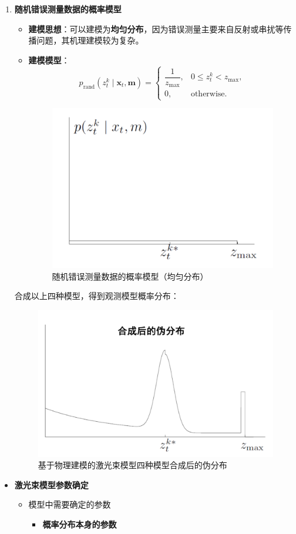 \documentclass[../main.tex]{subfiles}
\begin{document}
\begin{enumerate}
\begin{enumerate}
    \item \textbf{随机错误测量数据的概率模型}
    \begin{itemize}
        \item \textbf{建模思想}：可以建模为\textbf{均匀分布}，因为错误测量主要来自反射或串扰等传播问题，其机理建模较为复杂。
        \item \textbf{建模模型}：
        \[
        p_{\mathrm{rand}}\!\left(z_t^{k}\mid \mathbf{x}_t,\mathbf{m}\right)=
        \begin{cases}
            \dfrac{1}{z_{\max}}, & 0\le z_t^{k}<z_{\max},\\[6pt]
            0, & \text{otherwise}.
        \end{cases}
        \]
        \begin{figure}[H]
            \centering
            \includegraphics[width=0.35\linewidth]{images/guance4.png}
            \caption{随机错误测量数据的概率模型（均匀分布）}
        \end{figure}
    \end{itemize}
    合成以上四种模型，得到观测模型概率分布：
        \begin{figure}[H]
            \centering
            \includegraphics[width=0.35\linewidth]{images/guance5.png}
            \caption{基于物理建模的激光束模型四种模型合成后的伪分布}
        \end{figure}
\end{enumerate}
            \begin{itemize}
            \item \textbf{激光束模型参数确定}
            \begin{itemize}
                \item 模型中需要确定的参数
                \begin{itemize}
                    \item \textbf{概率分布本身的参数}

\end{itemize}
\end{itemize}
\end{itemize}
\end{enumerate}
\end{document}
